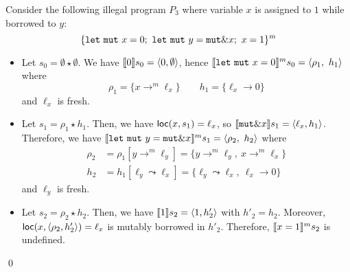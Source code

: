 \begin{example}
  Consider the following illegal program $P_3$
  where variable $x$ is assigned to $1$ while
  borrowed to $y$:
  \[
    \{
      \mathtt{let\ mut}\ x = 0;\
      \mathtt{let\ mut}\ y = \mathtt{mut}\borrow x;\
      x = 1
    \}^m
  \]
  \begin{itemize}
    \item Let $s_0=\emptyset \star \emptyset$.
    We have $\den[0]{s_0} = \langle 0,\emptyset\rangle$, hence
    $\denl[\mathtt{let\ mut}\ x = 0]{m}{s_0} =
    \langle \rho_1,\ h_1\rangle$ where
    \[\rho_1=\{x\to^m\ell_x\} \qquad
    h_1 = \{\ell_x\to 0\}\]
    and $\ell_x$ is fresh.
    \item Let $s_1 = \rho_1 \star h_1$.
    Then, we have $\loc(x,s_1) = \ell_x$, so
    $\den[\mathtt{mut}\borrow x]{s_1} = \langle \ell_x,h_1\rangle$.
    Therefore, we have
    $\denl[\mathtt{let\ mut}\ y = \mathtt{mut}\borrow x]{m}{s_1} =
    \langle \rho_2,\ h_2\rangle$
    where
    \begin{align*}
      \rho_2 & = \rho_1[y\to^m\ell_y] = \{y\to^m\ell_y,\ x\to^m\ell_x\}\\
      h_2 & = h_1[\ell_y\leadsto \ell_x] =
      \{\ell_y\leadsto \ell_x,\ \ell_x\to 0\}
    \end{align*}
    and $\ell_y$ is fresh.
    \item Let $s_2 = \rho_2 \star h_2$.
    Then, we have $\den[1]{s_2} = \langle 1,h'_2\rangle$ with $h'_2=h_2$.
    Moreover, $\loc(x,\langle\rho_2,h'_2\rangle) = \ell_x$ is
    mutably borrowed in $h'_2$.
    Therefore, $\denl[x = 1]{m}{s_2}$ is undefined.
  \end{itemize}
  \qed
\end{example}
